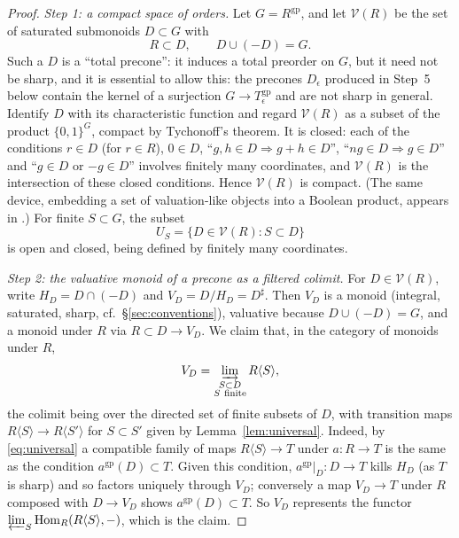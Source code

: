 \documentclass[11pt]{article}
\newcommand{\gp}{\mathrm{gp}}
\newcommand{\Hom}{\operatorname{Hom}}
\newcommand{\V}{\mathcal V}
\theoremstyle{definition}
\theoremstyle{remark}
\begin{document}
\begin{proof}
\emph{Step 1: a compact space of orders.}
Let \(G=R^{\gp}\), and let \(\V(R)\) be the set of saturated submonoids
\(D\subset G\) with
\[
                         R\subset D,\qquad D\cup(-D)=G .
\]
Such a \(D\) is a ``total precone'': it induces a total preorder on \(G\),
but it need not be sharp, and it is essential to allow this: the precones
\(D_\epsilon\) produced in Step~5 below contain the kernel of a surjection
\(G\to T_\epsilon^{\gp}\) and are not sharp in general.  Identify \(D\) with its characteristic
function and regard \(\V(R)\) as a subset of the product \(\{0,1\}^{G}\),
compact by Tychonoff's theorem.  It is closed: each of the conditions
\(r\in D\) (for \(r\in R\)), \(0\in D\), ``\(g,h\in D\Rightarrow g+h\in D\)'',
``\(ng\in D\Rightarrow g\in D\)'' and ``\(g\in D\) or \(-g\in D\)'' involves
finitely many coordinates, and \(\V(R)\) is the intersection of these closed
conditions.  Hence \(\V(R)\) is compact.  (The same device, embedding a set of
valuation-like objects into a Boolean product, appears in
\cite[Lemma~5.3.6]{CT}.)  For finite \(S\subset G\), the subset
\[
                       U_S=\{D\in\V(R):S\subset D\}
\]
is open and closed, being defined by finitely many coordinates.

\emph{Step 2: the valuative monoid of a precone as a filtered colimit.}
For \(D\in\V(R)\), write \(H_D=D\cap(-D)\) and \(V_D=D/H_D=D^\sharp\).
Then \(V_D\) is a monoid (integral, saturated, sharp, cf.\
\S\ref{sec:conventions}), valuative because \(D\cup(-D)=G\), and a monoid
under \(R\) via \(R\subset D\to V_D\).  We claim that, in the category of
monoids under \(R\),
\begin{equation}
       V_D=\varinjlim_{\substack{S\subset D\\ S\ {\rm finite}}}
                                         R\langle S\rangle,
                         \label{eq:valcolim}
\end{equation}
the colimit being over the directed set of finite subsets of \(D\), with
transition maps \(R\langle S\rangle\to R\langle S'\rangle\) for
\(S\subset S'\) given by Lemma~\ref{lem:universal}.  Indeed, by
\eqref{eq:universal} a compatible family of maps \(R\langle S\rangle\to T\)
under \(a:R\to T\) is the same as the condition \(a^{\gp}(D)\subset T\).
Given this condition, \(a^{\gp}|_D:D\to T\) kills \(H_D\) (as \(T\) is sharp)
and so factors uniquely through \(V_D\); conversely a map \(V_D\to T\) under
\(R\) composed with \(D\to V_D\) shows \(a^{\gp}(D)\subset T\).  So \(V_D\)
represents the functor \(\varprojlim_S\Hom_R(R\langle S\rangle,-)\), which is
the claim.


\end{proof}
\end{document}
